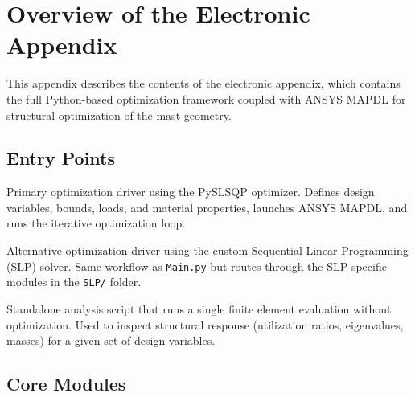 \section*{Overview of the Electronic Appendix}
\label{app:electronic}

This appendix describes the contents of the electronic appendix, which contains the full Python-based optimization framework coupled with ANSYS MAPDL for structural optimization of the mast geometry.

\subsection*{Entry Points}

\begin{description}[style=nextline, leftmargin=2.5cm]

    \item[\texttt{Main.py}]
    Primary optimization driver using the PySLSQP optimizer.
    Defines design variables, bounds, loads, and material properties, launches ANSYS MAPDL, and runs the iterative optimization loop.

    \item[\texttt{Main\_SLP.py}]
    Alternative optimization driver using the custom Sequential Linear Programming (SLP) solver.
    Same workflow as \texttt{Main.py} but routes through the SLP-specific modules in the \texttt{SLP/} folder.

    \item[\texttt{Main\_Test.py}]
    Standalone analysis script that runs a single finite element evaluation without optimization.
    Used to inspect structural response (utilization ratios, eigenvalues, masses) for a given set of design variables.

\end{description}

\subsection*{Core Modules}

